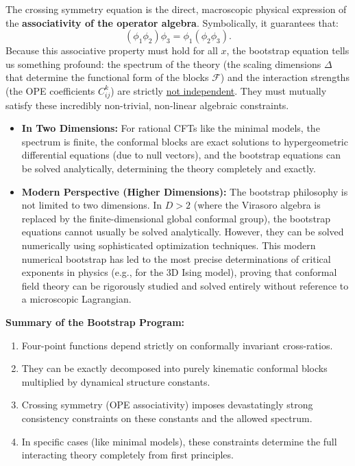 The crossing symmetry equation is the direct, macroscopic physical expression of the \textbf{associativity of the operator algebra}. Symbolically, it guarantees that:
\[
    (\phi_1 \phi_2)\phi_3 = \phi_1(\phi_2 \phi_3).
\]
Because this associative property must hold for all $x$, the bootstrap equation tells us something profound: the spectrum of the theory (the scaling dimensions $\Delta$ that determine the functional form of the blocks $\mathcal{F}$) and the interaction strengths (the OPE coefficients $C_{ij}^k$) are strictly \uline{not independent}. They must mutually satisfy these incredibly non-trivial, non-linear algebraic constraints.

\begin{itemize}
    \item \textbf{In Two Dimensions:} For rational CFTs like the minimal models, the spectrum is finite, the conformal blocks are exact solutions to hypergeometric differential equations (due to null vectors), and the bootstrap equations can be solved analytically, determining the theory completely and exactly.
    \item \textbf{Modern Perspective (Higher Dimensions):} The bootstrap philosophy is not limited to two dimensions. In $D > 2$ (where the Virasoro algebra is replaced by the finite-dimensional global conformal group), the bootstrap equations cannot usually be solved analytically. However, they can be solved numerically using sophisticated optimization techniques. This modern numerical bootstrap has led to the most precise determinations of critical exponents in physics (e.g., for the 3D Ising model), proving that conformal field theory can be rigorously studied and solved entirely without reference to a microscopic Lagrangian.
\end{itemize}

\textbf{Summary of the Bootstrap Program:}
\begin{enumerate}
    \item Four-point functions depend strictly on conformally invariant cross-ratios.
    \item They can be exactly decomposed into purely kinematic conformal blocks multiplied by dynamical structure constants.
    \item Crossing symmetry (OPE associativity) imposes devastatingly strong consistency constraints on these constants and the allowed spectrum.
    \item In specific cases (like minimal models), these constraints determine the full interacting theory completely from first principles.
\end{enumerate}


